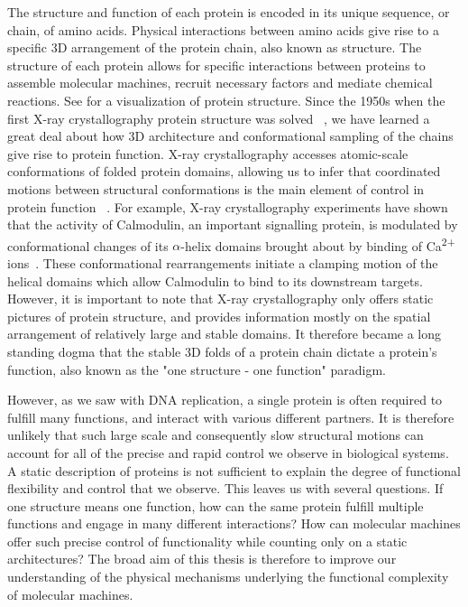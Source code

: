 The structure and function of each protein is encoded in its unique sequence, or chain, of amino acids. Physical interactions between amino acids give rise to a specific 3D arrangement of the protein chain, also known as structure. The structure of each protein allows for specific interactions between  proteins  to  assemble molecular machines, recruit  necessary factors and mediate chemical reactions. See  for a visualization of protein structure. Since the 1950s when the first X-ray crystallography protein structure was solved ~\cite{kendrew1958three}, we have learned a great deal about how 3D architecture and conformational sampling of the chains give rise to protein function. X-ray crystallography accesses atomic-scale conformations of folded protein  domains, allowing us to infer that  coordinated  motions between structural conformations is the main element of control in protein function ~\cite{hegyi1999relationship}. For example, X-ray crystallography experiments have shown that the activity of Calmodulin, an important signalling protein, is modulated by conformational changes of its $\alpha$-helix domains brought about by binding of Ca\textsuperscript{2+} ions~\cite{meador1992target}. These conformational rearrangements initiate a clamping motion of the helical domains which allow Calmodulin to bind to its downstream targets. However, it is important to note that X-ray crystallography only offers static pictures of protein structure, and provides information mostly on the spatial arrangement of relatively large and stable domains. It therefore became a long standing dogma that the stable 3D folds of a protein chain dictate a protein's function, also known as the "one structure - one function" paradigm. 

However, as we saw with DNA replication, a single protein is often required to fulfill many functions, and interact with various different partners. It is therefore unlikely that such large scale and consequently slow structural motions can account for all of the precise and rapid control we observe in biological systems. A static description of proteins is not sufficient to explain the degree of functional flexibility and control that we observe. This leaves us with several questions. If one structure means one function, how can the same protein fulfill multiple functions and engage in many different interactions? How can molecular machines offer such precise control of functionality while counting only on a static architectures? The broad aim of this thesis is therefore to improve our understanding of the physical mechanisms underlying the functional complexity of molecular machines.

